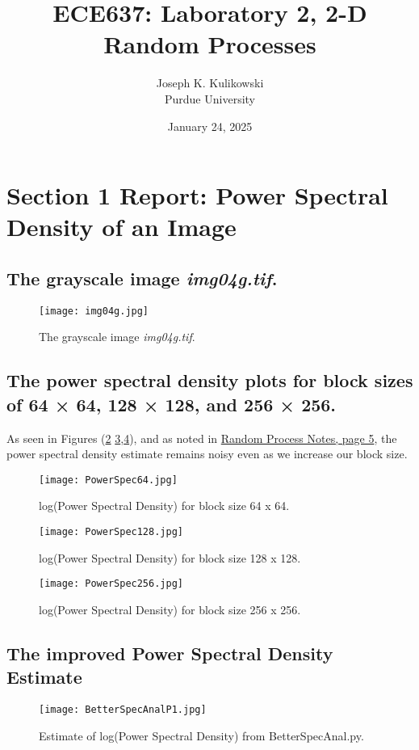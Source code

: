 \documentclass{article}
\title{ECE637: Laboratory 2, 2-D Random Processes}
\author{Joseph K. Kulikowski \\
Purdue University}
\date{January 24, 2025}
\begin{document}
\maketitle
\tableofcontents
\listoffigures
\lstlistoflistings
\newpage

\section{Section 1 Report: Power Spectral Density of an Image}
\subsection{The grayscale image \textit{img04g.tif}.}
\begin{figure}[h]
    \centering
    \texttt{[image: img04g.jpg]}
    \caption{The grayscale image \textit{img04g.tif}.}
    \label{fig:1}
\end{figure}

\newpage
\subsection{The power spectral density plots for block sizes of 64 × 64, 128 × 128, and 256 × 256.}
As seen in Figures (\ref{fig:2} \ref{fig:3},\ref{fig:4}), and as noted in \href{https://engineering.purdue.edu/~bouman/ece637/notes/pdf/RandProc.pdf}{Random Process Notes, page 5}, the power spectral density estimate remains noisy even as we increase our block size.
\begin{figure}[h]
    \centering
    \texttt{[image: PowerSpec64.jpg]}
    \caption{log(Power Spectral Density) for block size 64 x 64.}
    \label{fig:2}
\end{figure}
\newpage
\begin{figure}[h]
    \centering
    \texttt{[image: PowerSpec128.jpg]}
    \caption{log(Power Spectral Density) for block size 128 x 128.}
    \label{fig:3}
\end{figure}
\newpage
\begin{figure}[h]
    \centering
    \texttt{[image: PowerSpec256.jpg]}
    \caption{log(Power Spectral Density) for block size 256 x 256.}
    \label{fig:4}
\end{figure}

\newpage
\subsection{The improved Power Spectral Density Estimate}
\begin{figure}[h]
    \centering
    \texttt{[image: BetterSpecAnalP1.jpg]}
    \caption{Estimate of log(Power Spectral Density) from BetterSpecAnal.py.}
    \label{fig:5}
\end{figure}
\end{document}

